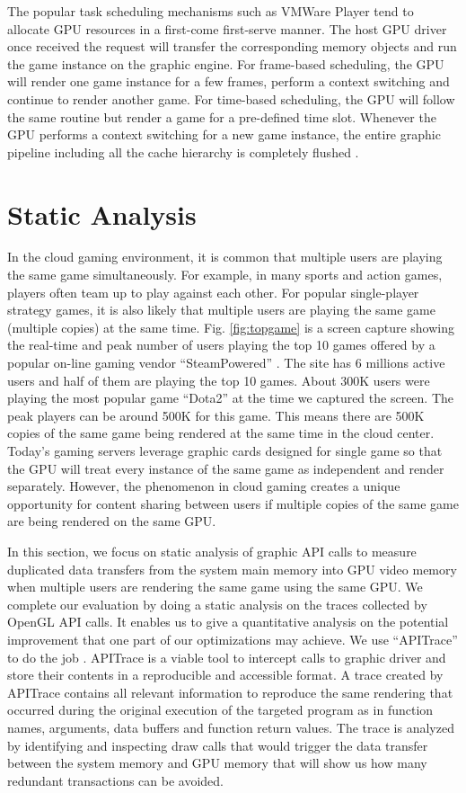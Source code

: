 \documentclass[pageno]{jpaper}
\begin{document}
The popular task scheduling
mechanisms such as VMWare Player \cite{vm} tend to allocate
GPU resources in a first-come first-serve manner. The host GPU driver once received the request will transfer the corresponding memory objects and run the game instance on the graphic engine. For frame-based scheduling, the GPU will render one game instance for a few frames, perform a context switching and continue to render another game. For time-based scheduling, the GPU will follow the same routine but render a game for a pre-defined time slot. Whenever the GPU performs a context switching for a new game instance, the entire graphic pipeline including all the cache hierarchy is completely flushed \cite{flush1}\cite{flush2}.

\section{Static Analysis}\label{sec:analysis}

 In the cloud gaming environment, it is common that multiple users are playing the same game simultaneously. For example, in many sports and action games, players often team up to play against each other. For popular single-player strategy games, it is also likely that multiple users are playing the same game (multiple copies) at the same time. Fig. \ref{fig:topgame} is a screen capture showing the real-time and peak number of users playing the top 10 games offered by a popular on-line gaming vendor ``SteamPowered'' \cite{steampowered}. The site has 6 millions active users and half of them are playing the top 10 games. About 300K users were playing the most popular game ``Dota2'' at the time we captured the screen. The peak players can be around 500K for this game. This means there are 500K copies of the same game being rendered at the same time in the cloud center. Today's gaming servers leverage graphic cards designed for single game so that the GPU will treat every instance of the same game as independent and render separately. However, the phenomenon in cloud gaming creates a unique opportunity for content sharing between users if multiple copies of the same game are being rendered on the same GPU.

In this section, we focus on static analysis of graphic API calls to measure duplicated data transfers from the system main memory into GPU video memory when multiple users are rendering the same game using the same GPU. We complete our evaluation by doing a static analysis on the traces collected by OpenGL API calls. It enables us to give a quantitative analysis on the potential improvement that one part of our optimizations may achieve. We use ``APITrace'' to do the job \cite{apitrace}. APITrace is a viable tool to intercept calls to graphic driver and store their contents in a reproducible and accessible format. A trace created by APITrace contains all relevant information to reproduce the same rendering that occurred during the original execution of the targeted program as in function names, arguments, data buffers and function return values. The trace is analyzed by identifying and inspecting draw calls that would trigger the data transfer between the system memory and GPU memory that will show us how many redundant transactions can be avoided.
\end{document}
